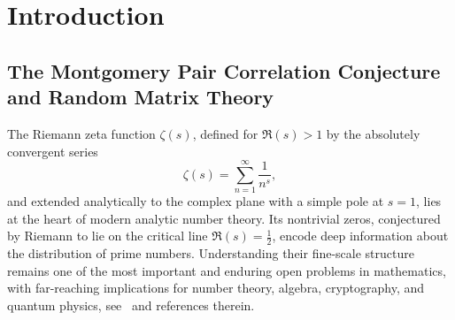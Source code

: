 \documentclass[12pt,reqno]{amsart}
\theoremstyle{plain}
\theoremstyle{definition}
\theoremstyle{remark}
\begin{document}
\begin{abstract}
To pass from this ensemble result to the genuine Hardy \(Z\)-function on the whole critical line, we apply Selberg’s probabilistic theory of the argument \(S(t)\) to prove that the sequence of pair–correlation observables \(PC_N(f; \overline{1})\) of \(Z_N(t;\overline{1})\) on different windows \([2N,2N+2]\) behaves asymptotically like a decorrelated sample drawn from the GUE-distributed ensembles on \(\mathcal{RH}_N(\mathbb{R})\), for $N \in \mathbb{N}$. This quenched limit upgrades the averaged GUE law on \(\mathcal{RH}_N(\mathbb{R})\) to a deterministic statement for \(Z(t)\), and yields the GUE pair–correlation law for the nontrivial zeros of \(\zeta(s)\), as anticipated by Montgomery.

\end{abstract}


\section{Introduction}

\subsection{The Montgomery Pair Correlation Conjecture and Random Matrix Theory} The Riemann zeta function \( \zeta(s) \), defined for \( \Re(s) > 1 \) by the absolutely convergent series
\begin{equation}
\zeta(s) = \sum_{n=1}^\infty \frac{1}{n^s},
\end{equation}
and extended analytically to the complex plane with a simple pole at \( s = 1 \), lies at the heart of modern analytic number theory. Its nontrivial zeros, conjectured by Riemann to lie on the critical line \( \Re(s) = \frac{1}{2} \), encode deep information about the distribution of prime numbers. Understanding their fine-scale structure remains one of the most important and enduring open problems in mathematics, with far-reaching implications for number theory, algebra, cryptography, and quantum physics, see~\cite{Borwein2008Riemann, RHP} and references therein.
\end{document}
